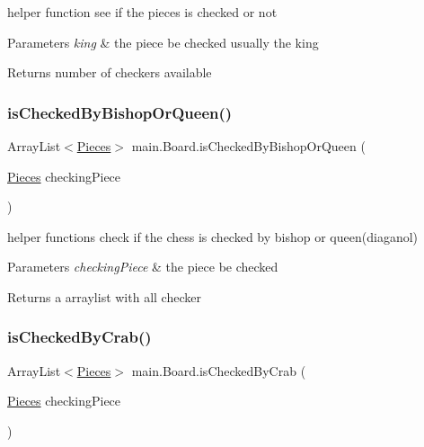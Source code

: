 helper function see if the pieces is checked or not 
\begin{DoxyParams}{Parameters}
{\em king} & the piece be checked usually the king \\
\hline
\end{DoxyParams}
\begin{DoxyReturn}{Returns}
number of checkers available 
\end{DoxyReturn}
\mbox{\label{classmain_1_1_board_a9f09fd303ca3099fd484f62dfad93835}} 
\subsubsection{\texorpdfstring{is\+Checked\+By\+Bishop\+Or\+Queen()}{isCheckedByBishopOrQueen()}}
{\footnotesize\ttfamily Array\+List$<$\mbox{\hyperlink{classmain_1_1_pieces}{Pieces}}$>$ main.\+Board.\+is\+Checked\+By\+Bishop\+Or\+Queen (\begin{DoxyParamCaption}\item[{\mbox{\hyperlink{classmain_1_1_pieces}{Pieces}}}]{checking\+Piece }\end{DoxyParamCaption})\hspace{0.3cm}{\ttfamily [inline]}}

helper functions check if the chess is checked by bishop or queen(diaganol) 
\begin{DoxyParams}{Parameters}
{\em checking\+Piece} & the piece be checked \\
\hline
\end{DoxyParams}
\begin{DoxyReturn}{Returns}
a arraylist with all checker 
\end{DoxyReturn}
\mbox{\label{classmain_1_1_board_a2eeeef4c31734edf9ce59fe06e5821bd}} 
\subsubsection{\texorpdfstring{is\+Checked\+By\+Crab()}{isCheckedByCrab()}}
{\footnotesize\ttfamily Array\+List$<$\mbox{\hyperlink{classmain_1_1_pieces}{Pieces}}$>$ main.\+Board.\+is\+Checked\+By\+Crab (\begin{DoxyParamCaption}\item[{\mbox{\hyperlink{classmain_1_1_pieces}{Pieces}}}]{checking\+Piece }\end{DoxyParamCaption})\hspace{0.3cm}{\ttfamily [inline]}}

